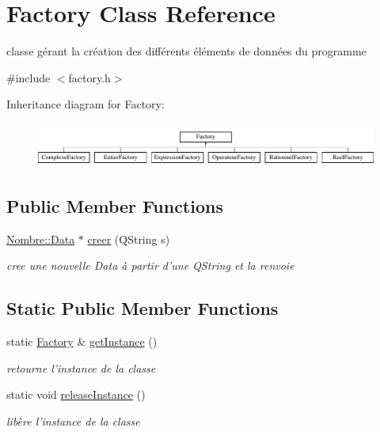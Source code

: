\hypertarget{classFactory}{
\section{Factory Class Reference}
\label{classFactory}
}


classe gérant la création des différents éléments de données du programme  




{\ttfamily \#include $<$factory.h$>$}

Inheritance diagram for Factory:\begin{figure}[H]
\begin{center}
\leavevmode
\includegraphics[height=1.48148cm]{classFactory}
\end{center}
\end{figure}
\subsection*{Public Member Functions}
\begin{DoxyCompactItemize}
\item 
\hyperlink{classNombre_1_1Data}{Nombre::Data} $\ast$ \hyperlink{classFactory_afe37851e80172944b37491a952a28370}{creer} (QString s)
\begin{DoxyCompactList}\small\item\em cree une nouvelle Data à partir d'une QString et la renvoie \item\end{DoxyCompactList}\end{DoxyCompactItemize}
\subsection*{Static Public Member Functions}
\begin{DoxyCompactItemize}
\item 
\hypertarget{classFactory_a7e83e40092e51b63c55cef6b859cda1c}{
static \hyperlink{classFactory}{Factory} \& \hyperlink{classFactory_a7e83e40092e51b63c55cef6b859cda1c}{getInstance} ()}
\label{classFactory_a7e83e40092e51b63c55cef6b859cda1c}

\begin{DoxyCompactList}\small\item\em retourne l'instance de la classe \item\end{DoxyCompactList}\item 
\hypertarget{classFactory_a19a1ea29727938017d6a61fe24aab08b}{
static void \hyperlink{classFactory_a19a1ea29727938017d6a61fe24aab08b}{releaseInstance} ()}
\label{classFactory_a19a1ea29727938017d6a61fe24aab08b}

\begin{DoxyCompactList}\small\item\em libère l'instance de la classe \item\end{DoxyCompactList}\end{DoxyCompactItemize}


